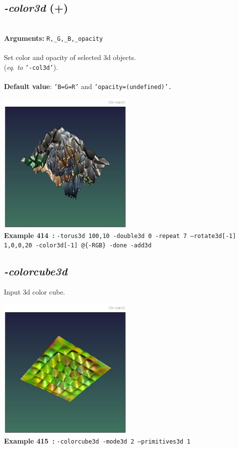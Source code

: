 \documentclass[a4paper,11pt,twoside]{book}
\begin{document}
\subsection{\emph{-color3d} (+)}\vspace*{-0.5em}
~\\\textbf{Arguments: } 
{\small \texttt{R,\_G,\_B,\_opacity}}\\~\\
Set color and opacity of selected 3d objects.
~\\(\emph{eq. to} {\small \texttt{'-col3d'}}).
~\\~\\\textbf{Default value}: {\small \texttt{'B=G=R'} and \texttt{'opacity=(undefined)'.}}
\begin{center}\includegraphics[keepaspectratio=true,height=7cm,width=\textwidth]{img/gmic_def414.jpg}\\
{\footnotesize \textbf{Example 414~:} \texttt{-torus3d 100,10 -double3d 0 -repeat 7 --rotate3d[-1] 1,0,0,20 -color3d[-1] @\{-RGB\} -done -add3d}}
\end{center}

\subsection{\emph{-colorcube3d} }\vspace*{-0.5em}
Input 3d color cube.
\begin{center}\includegraphics[keepaspectratio=true,height=7cm,width=\textwidth]{img/gmic_def415.jpg}\\
{\footnotesize \textbf{Example 415~:} \texttt{-colorcube3d -mode3d 2 --primitives3d 1}}
\end{center}
\end{document}
